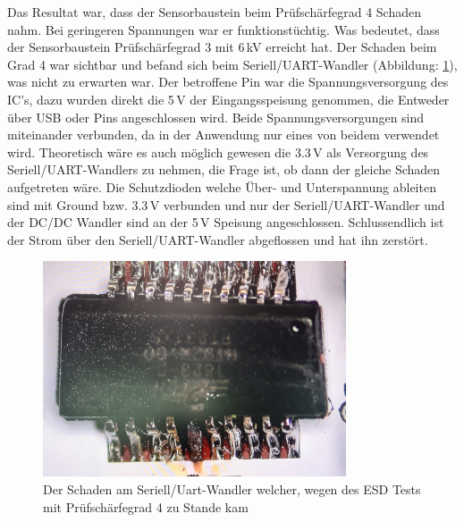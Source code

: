 Das Resultat war, dass der Sensorbaustein beim Prüfschärfegrad 4 Schaden nahm. Bei geringeren Spannungen war er funktionstüchtig. Was bedeutet, dass der Sensorbaustein Prüfschärfegrad 3 mit 6\,kV erreicht hat. Der Schaden beim Grad 4 war sichtbar und befand sich beim Seriell/UART-Wandler (Abbildung: \ref{pic: ESD_Schaden}), was nicht zu erwarten war. Der betroffene Pin war die Spannungsversorgung des IC's, dazu wurden direkt die 5\,V der Eingangsspeisung genommen, die Entweder über USB oder Pins angeschlossen wird. Beide Spannungsversorgungen sind miteinander verbunden, da in der Anwendung nur eines von beidem verwendet wird. Theoretisch wäre es auch möglich gewesen die 3.3\,V als Versorgung des Seriell/UART-Wandlers zu nehmen, die Frage ist, ob dann der gleiche Schaden aufgetreten wäre. Die Schutzdioden welche Über- und Unterspannung ableiten sind mit Ground bzw. 3.3\,V verbunden und nur der Seriell/UART-Wandler und der DC/DC Wandler sind an der 5\,V Speisung angeschlossen. Schlussendlich ist der Strom über den Seriell/UART-Wandler abgeflossen und hat ihn zerstört.

\begin{figure}[H]
	\centering
	\includegraphics[width=0.8\textwidth]{graphics/ESD_Schaden.jpg}
	\caption{Der Schaden am Seriell/Uart-Wandler welcher, wegen des ESD Tests mit Prüfschärfegrad 4 zu Stande kam}
	\label{pic: ESD_Schaden}
\end{figure}

